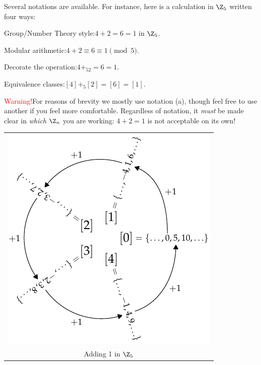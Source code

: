 Several notations are available. For instance, here is a calculation in $\Z_5$ written four ways:\par
\begin{minipage}[t]{0.62\linewidth}\vspace{0pt}
	\begin{enumeratea}
	  \item Group/Number Theory style:\quad $4+2=6=1$ in $\Z_5$.
	  \item Modular arithmetic:\quad $4+2\equiv 6\equiv 1\pmod 5$.
	  \item Decorate the operation:\quad $4+_52=6=1$.
	  \item Equivalence classes:\quad $[4]+_5[2]=[6]=[1]$.
	\end{enumeratea}
	\textcolor{red}{Warning!}\quad For reasons of brevity we mostly use notation (a), though feel free to use another if you feel more comfortable. Regardless of notation, it \emph{must} be made clear in \emph{which} $\Z_n$ you are working: $4+2=1$ is not acceptable on its own!
\end{minipage}
\hfill
\begin{minipage}[t]{0.37\linewidth}\vspace{-12pt}
		\flushright%
		\begin{tabular}{@{}c@{}}
		\includegraphics[scale=0.75]{cyclic-zn}\\
		Adding 1 in $\Z_5$\phantom{bo}
	\end{tabular}
\end{minipage}


